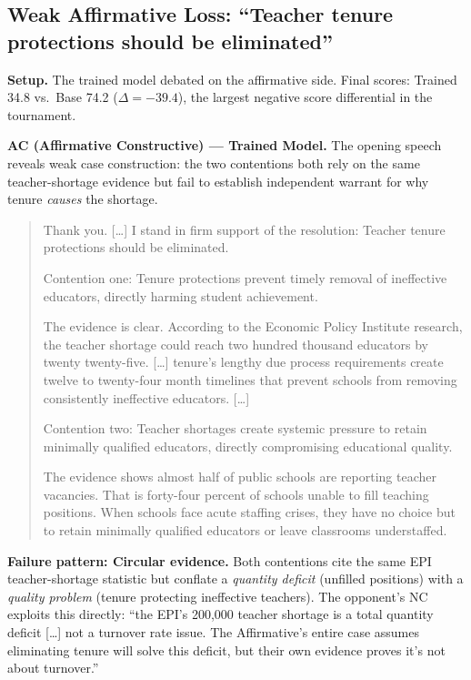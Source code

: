 \subsection{Weak Affirmative Loss: ``Teacher tenure protections should be eliminated''}
\label{app:aff_loss_example}

\noindent\textbf{Setup.} The trained model debated on the affirmative side.
Final scores: Trained 34.8 vs.\ Base 74.2 ($\Delta = -39.4$), the largest
negative score differential in the tournament.

\medskip
\noindent\textbf{AC (Affirmative Constructive) --- Trained Model.}
The opening speech reveals weak case construction: the two contentions both
rely on the same teacher-shortage evidence but fail to establish independent
warrant for why tenure \emph{causes} the shortage.

\begin{quote}
\small
Thank you. [\ldots] I stand in firm support of the resolution: Teacher tenure
protections should be eliminated.

Contention one: Tenure protections prevent timely removal of ineffective
educators, directly harming student achievement.

The evidence is clear. According to the Economic Policy Institute research,
the teacher shortage could reach two hundred thousand educators by
twenty twenty-five. [\ldots] tenure's lengthy due process requirements create
twelve to twenty-four month timelines that prevent schools from removing
consistently ineffective educators. [\ldots]

Contention two: Teacher shortages create systemic pressure to retain
minimally qualified educators, directly compromising educational quality.

The evidence shows almost half of public schools are reporting teacher
vacancies. That is forty-four percent of schools unable to fill teaching
positions. When schools face acute staffing crises, they have no choice but
to retain minimally qualified educators or leave classrooms understaffed.
\end{quote}

\noindent\textbf{Failure pattern: Circular evidence.}
Both contentions cite the same EPI teacher-shortage statistic but conflate
a \emph{quantity deficit} (unfilled positions) with a \emph{quality problem}
(tenure protecting ineffective teachers). The opponent's NC exploits this
directly: ``the EPI's 200,000 teacher shortage is a total quantity
deficit [\ldots] not a turnover rate issue. The Affirmative's entire case
assumes eliminating tenure will solve this deficit, but their own evidence
proves it's not about turnover.''

